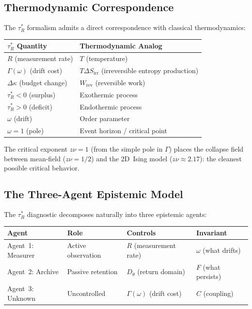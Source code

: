 \documentclass[
  aps,
  prd,
  preprint,
  superscriptaddress,
  nofootinbib,
  floatfix,
  longbibliography
]{revtex4-2}
\newcommand{\tRstar}{\tau_{\!R}^{*}}
\newcommand{\Gam}{\Gamma}
\newcommand{\Fid}{F}
\newcommand{\Drft}{\omega}
\newcommand{\Curv}{C}
\newcommand{\Logint}{\kappa}
\begin{document}
\subsection{Thermodynamic Correspondence}

The $\tRstar$ formalism admits a direct correspondence
with classical thermodynamics:

\begin{center}
\begin{tabular}{@{}ll@{}}
\toprule
\textbf{$\tRstar$ Quantity} & \textbf{Thermodynamic Analog} \\
\midrule
$R$ (measurement rate) & $T$ (temperature) \\
$\Gam(\Drft)$ (drift cost) & $T \Delta S_{\mathrm{irr}}$
  (irreversible entropy production) \\
$\Delta\Logint$ (budget change) & $W_{\mathrm{rev}}$
  (reversible work) \\
$\tRstar < 0$ (surplus) & Exothermic process \\
$\tRstar > 0$ (deficit) & Endothermic process \\
$\Drft$ (drift) & Order parameter \\
$\Drft = 1$ (pole) & Event horizon / critical point \\
\bottomrule
\end{tabular}
\end{center}

The critical exponent $z\nu = 1$ (from the simple pole in
$\Gam$) places the collapse field between mean-field
($z\nu = 1/2$) and the 2D~Ising model ($z\nu \approx 2.17$):
the cleanest possible critical behavior.

\subsection{The Three-Agent Epistemic Model}

The $\tRstar$ diagnostic decomposes naturally into three
epistemic agents:

\begin{center}
\begin{tabular}{@{}llll@{}}
\toprule
\textbf{Agent} & \textbf{Role} & \textbf{Controls} &
  \textbf{Invariant} \\
\midrule
Agent~1: Measurer  & Active observation &
  $R$ (measurement rate) & $\Drft$ (what drifts) \\
Agent~2: Archive   & Passive retention  &
  $D_\theta$ (return domain) & $\Fid$ (what persists) \\
Agent~3: Unknown   & Uncontrolled & $\Gam(\Drft)$ (drift cost) &
  $\Curv$ (coupling) \\
\bottomrule
\end{tabular}
\end{center}
\end{document}
